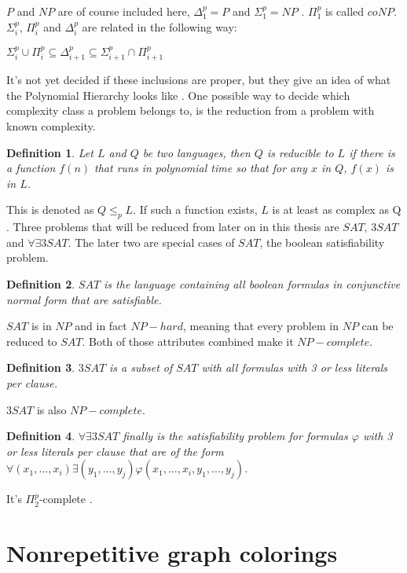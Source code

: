 \documentclass[12pt,a4paper]{article}
\newtheorem{definition}{Definition}
\begin{document}
$P$ and $NP$ are of course included here, $\Delta^p_1 = P$ and $\Sigma^p_1 = NP$ \citep{Meyer1972}. $\Pi^p_1 $ is called $coNP$.
\newline
$\Sigma^p_i$, $\Pi^p_i$ and $\Delta^p_i$ are related in the following way:
\begin{center}
	$\Sigma^p_i \cup \Pi^p_i \subseteq \Delta^p_{i+1} \subseteq \Sigma^p_{i+1} \cap \Pi^p_{i+1}$
\end{center}
It's not yet decided if these inclusions are proper, but they give an idea of what the Polynomial Hierarchy looks like \citep{Stockmeyer1976}.
\newline
One possible way to decide which complexity class a problem belongs to, is the reduction from a problem with known complexity. 
\begin{definition} Let $L$ and $Q$ be two languages, then $Q$ is reducible to $L$ if there is a function $f(n)$ that runs in polynomial time so that for any $x$ in $Q$, $f(x)$ is in $L$. 
\end{definition} 
This is denoted as $Q \leq_p L$. If such a function exists, $L$ is at least as complex as Q \citep{Davis1983}. 
\newline
Three problems that will be reduced from later on in this thesis are $SAT$, $3SAT$ and $\forall \exists 3SAT$. The later two are special cases of $SAT$, the boolean satisfiability problem. 
\begin{definition} 
$SAT$ is the language containing all boolean formulas in conjunctive normal form that are satisfiable. 
\end{definition} 
$SAT$ is in $NP$ and in fact $NP-hard$, meaning that every problem in $NP$ can be reduced to $SAT$. Both of those attributes combined make it $NP-complete$. \citep[p. 338-346]{Davis1983} 
\begin{definition} $3SAT$ is a subset of $SAT$ with all formulas with 3 or less literals per clause.
\end{definition} 
$3SAT$ is also $NP-complete$. \citep[p. 347]{Davis1983} 
\begin{definition}
$\forall \exists 3SAT$ finally is the satisfiability problem for formulas $\varphi$ with 3 or less literals per clause that are of the form \\ $\forall (x_1, ..., x_i) \exists (y_1, ..., y_j) \varphi(x_1, ..., x_i, y_1, ..., y_j)$.
\end{definition} 
It's $\Pi^p_2$-complete \citep{Schaefer2002}.

\newpage
\section{Nonrepetitive graph colorings}
\end{document}

